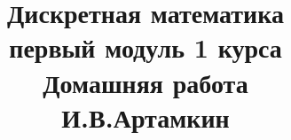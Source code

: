 \documentclass[fleqn]{article}
\title{Дискретная математика \\ первый модуль 1 курса \\ Домашняя работа \\ И.В.Артамкин}
\begin{document}
	\maketitle
	\pagebreak
	
	
	\tableofcontents
	
	\newpage



			
\end{document}
